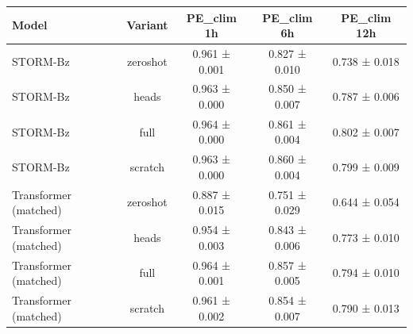 \begin{tabular}{lcccc}
\toprule
Model & Variant & PE\_clim 1h & PE\_clim 6h & PE\_clim 12h \\
\midrule
STORM-Bz & zeroshot & 0.961 ± 0.001 & 0.827 ± 0.010 & 0.738 ± 0.018 \\
STORM-Bz & heads & 0.963 ± 0.000 & 0.850 ± 0.007 & 0.787 ± 0.006 \\
STORM-Bz & full & 0.964 ± 0.000 & 0.861 ± 0.004 & 0.802 ± 0.007 \\
STORM-Bz & scratch & 0.963 ± 0.000 & 0.860 ± 0.004 & 0.799 ± 0.009 \\
Transformer (matched) & zeroshot & 0.887 ± 0.015 & 0.751 ± 0.029 & 0.644 ± 0.054 \\
Transformer (matched) & heads & 0.954 ± 0.003 & 0.843 ± 0.006 & 0.773 ± 0.010 \\
Transformer (matched) & full & 0.964 ± 0.001 & 0.857 ± 0.005 & 0.794 ± 0.010 \\
Transformer (matched) & scratch & 0.961 ± 0.002 & 0.854 ± 0.007 & 0.790 ± 0.013 \\
\bottomrule
\end{tabular}
